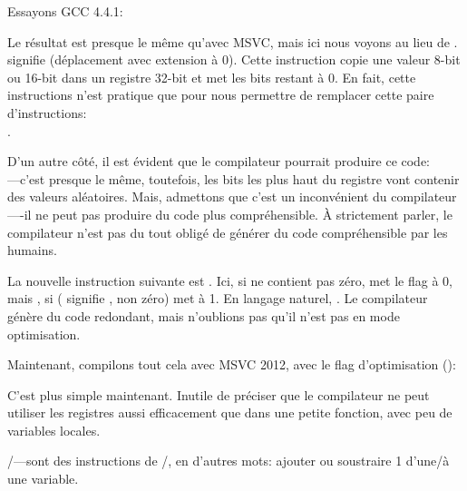 Essayons GCC 4.4.1:



\label{movzx}

Le résultat est presque le même qu'avec MSVC, mais ici nous voyons \MOVZX au lieu
de \MOVSX.
\MOVZX signifie  (déplacement avec extension à 0).
Cette instruction copie une valeur 8-bit ou 16-bit dans un registre 32-bit et met
les bits restant à 0.
En fait, cette instructions n'est pratique que pour nous permettre de remplacer cette
paire d'instructions:\\
.

D'un autre côté, il est évident que le compilateur pourrait produire ce code: \\
---c'est presque le même, toutefois, les
bits les plus haut du registre \EAX vont contenir des valeurs aléatoires.
Mais, admettons que c'est un inconvénient du compilateur----il ne peut pas produire
du code plus compréhensible. À strictement parler, le compilateur n'est pas du tout
obligé de générer du code compréhensible par les humains.


La nouvelle instruction suivante est \SETNZ.
Ici, si \AL ne contient pas zéro,  met le flag \ZF à 0, mais \SETNZ,
si  ( signifie , non zéro) met \AL à 1. En langage
naturel, . Le compilateur génère
du code redondant, mais n'oublions pas qu'il n'est pas en mode optimisation.

\label{strlen_MSVC_Ox}

Maintenant, compilons tout cela avec MSVC 2012, avec le flag d'optimisation (\Ox):



C'est plus simple maintenant. Inutile de préciser que le compilateur ne peut utiliser
les registres aussi efficacement que dans une petite fonction, avec peu de variables
locales.

\INC/\DEC---sont des instructions de /,
en d'autres mots: ajouter ou soustraire 1 d'une/à une variable.

